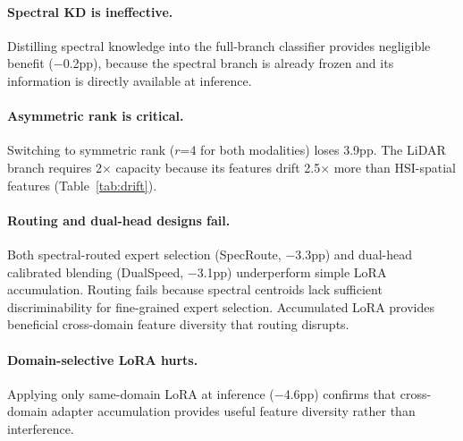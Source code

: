 \paragraph{Spectral KD is ineffective.}
Distilling spectral knowledge into the full-branch classifier provides negligible benefit ($-$0.2pp), because the spectral branch is already frozen and its information is directly available at inference.

\paragraph{Asymmetric rank is critical.}
Switching to symmetric rank ($r$=4 for both modalities) loses 3.9pp. The LiDAR branch requires 2$\times$ capacity because its features drift 2.5$\times$ more than HSI-spatial features (Table~\ref{tab:drift}).

\paragraph{Routing and dual-head designs fail.}
Both spectral-routed expert selection (SpecRoute, $-$3.3pp) and dual-head calibrated blending (DualSpeed, $-$3.1pp) underperform simple LoRA accumulation. Routing fails because spectral centroids lack sufficient discriminability for fine-grained expert selection. Accumulated LoRA provides beneficial cross-domain feature diversity that routing disrupts.

\paragraph{Domain-selective LoRA hurts.}
Applying only same-domain LoRA at inference ($-$4.6pp) confirms that cross-domain adapter accumulation provides useful feature diversity rather than interference.
